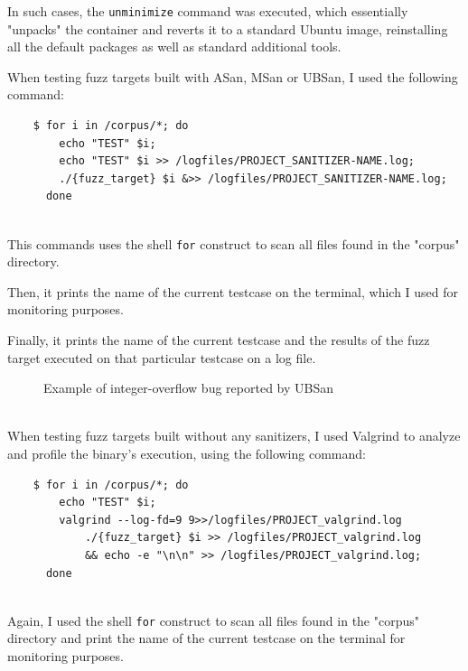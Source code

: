 In such cases, the \verb|unminimize| command was executed, which essentially "unpacks" the container and reverts it to a standard Ubuntu image, reinstalling all the default packages as well as standard additional tools.

\newpage
When testing fuzz targets built with ASan, MSan or UBSan, I used the following command:
\begin{verbatim}
    $ for i in /corpus/*; do 
        echo "TEST" $i; 
        echo "TEST" $i >> /logfiles/PROJECT_SANITIZER-NAME.log; 
        ./{fuzz_target} $i &>> /logfiles/PROJECT_SANITIZER-NAME.log; 
      done
\end{verbatim}
\ \\
This commands uses the shell \verb|for| construct to scan all files found in the "corpus" directory.

Then, it prints the name of the current testcase on the terminal, which I used for monitoring purposes.

Finally, it prints the name of the current testcase and the results of the fuzz target executed on that particular testcase on a log file.

\begin{figure}[h]
\caption{Example of integer-overflow bug reported by UBSan}
\label{fig:ubsan_example}
\end{figure}
\ \\

\newpage
When testing fuzz targets built without any sanitizers, I used Valgrind to analyze and profile the binary's execution, using the following command:
\begin{verbatim}
    $ for i in /corpus/*; do 
        echo "TEST" $i; 
        valgrind --log-fd=9 9>>/logfiles/PROJECT_valgrind.log 
            ./{fuzz_target} $i >> /logfiles/PROJECT_valgrind.log 
            && echo -e "\n\n" >> /logfiles/PROJECT_valgrind.log; 
      done
\end{verbatim}
\ \\
Again, I used the shell \verb|for| construct to scan all files found in the "corpus" directory and print the name of the current testcase on the terminal for monitoring purposes.

